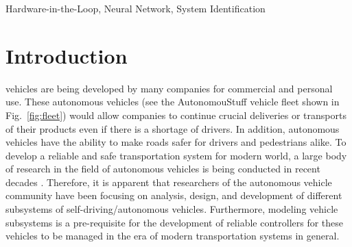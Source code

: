 \documentclass[journal,twoside,web]{ieeecolor}
\begin{document}
\begin{IEEEkeywords}
Hardware-in-the-Loop, Neural Network, System Identification
\end{IEEEkeywords}

\section{Introduction}
\label{sec:introduction}
 vehicles are being developed by many companies for commercial and
personal use. These autonomous vehicles (see the AutonomouStuff vehicle fleet
shown in Fig.~\ref{fig:fleet}) would allow companies to continue crucial deliveries
or transports of their products even if there is a shortage of drivers. In
addition, autonomous vehicles have the ability to make roads safer for drivers
and pedestrians alike. To develop a reliable and safe transportation system for
modern world, a large body of research in the field of autonomous vehicles is
being conducted in recent decades \cite{Liu2017} \cite{Prasad2020}.
Therefore, it is apparent that researchers of the autonomous vehicle community
have been focusing on analysis, design, and development of different subsystems
of self-driving/autonomous vehicles. Furthermore, modeling vehicle subsystems is
a pre-requisite for the development of reliable controllers for these vehicles
to be managed in the era of modern transportation systems in general.

\end{document}
